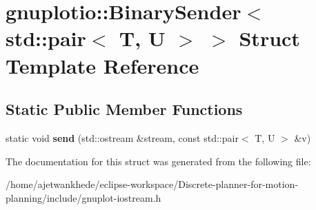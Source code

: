 \hypertarget{structgnuplotio_1_1BinarySender_3_01std_1_1pair_3_01T_00_01U_01_4_01_4}{}\section{gnuplotio\+:\+:Binary\+Sender$<$ std\+:\+:pair$<$ T, U $>$ $>$ Struct Template Reference}
\label{structgnuplotio_1_1BinarySender_3_01std_1_1pair_3_01T_00_01U_01_4_01_4}
\subsection*{Static Public Member Functions}
\begin{DoxyCompactItemize}
\item 
\mbox{\label{structgnuplotio_1_1BinarySender_3_01std_1_1pair_3_01T_00_01U_01_4_01_4_a9d949c8e7b1dea493288b0a2dd95cbff}} 
static void {\bfseries send} (std\+::ostream \&stream, const std\+::pair$<$ T, U $>$ \&v)
\end{DoxyCompactItemize}


The documentation for this struct was generated from the following file\+:\begin{DoxyCompactItemize}
\item 
/home/ajetwankhede/eclipse-\/workspace/\+Discrete-\/planner-\/for-\/motion-\/planning/include/gnuplot-\/iostream.\+h\end{DoxyCompactItemize}
